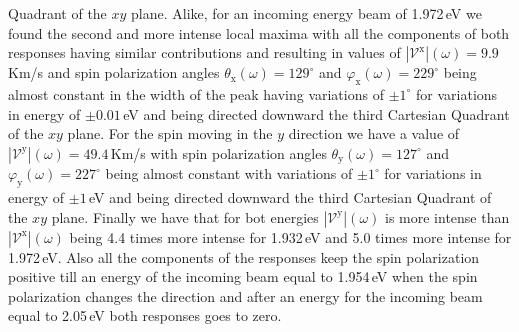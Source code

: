 \documentclass[prb,11pt,tightenlines,twocolumn,aps]{revtex4-1}
\begin{document}
Quadrant of the $xy$ plane.
% 
Alike, for an incoming energy beam of 1.972\,eV we found the second and more
intense local maxima with all the components of both responses having similar
contributions and resulting in values of
$|\mathcal{V}^{\mathrm{x}}|(\omega)=9.9$\,Km/s and spin polarization angles
$\theta_{\mathrm{x}}(\omega)=129^{\circ}$ and
$\varphi_{\mathrm{x}}(\omega)=229^{\circ}$ being almost constant in the width of
the peak having variations of $\pm1^{\circ}$ for variations in energy of
$\pm0.01$\,eV and being directed downward the third Cartesian Quadrant of the
$xy$ plane.
% 
For the spin moving in the $y$ direction we have a value of
$|\mathcal{V}^{\mathrm{y}}|(\omega)=49.4$\,Km/s with spin polarization angles
$\theta_{\mathrm{y}}(\omega)=127^{\circ}$ and
$\varphi_{\mathrm{y}}(\omega)=227^{\circ}$ being almost constant with variations
of $\pm1^{\circ}$ for variations in energy of $\pm1$\,eV and being directed
downward the third Cartesian Quadrant of the $xy$ plane.
% 
Finally we have that for bot energies $|\mathcal{V}^{\mathrm{y}}|(\omega)$ is
more intense than $|\mathcal{V}^{\mathrm{x}}|(\omega)$ being 4.4 times more
intense for 1.932\,eV and 5.0 times more intense for 1.972\,eV. Also all the
components of the responses keep the spin polarization positive till an energy
of the incoming beam equal to 1.954\,eV when the spin polarization changes the
direction and after an energy for the incoming beam equal to 2.05\,eV both
responses goes to zero.

\end{document}
